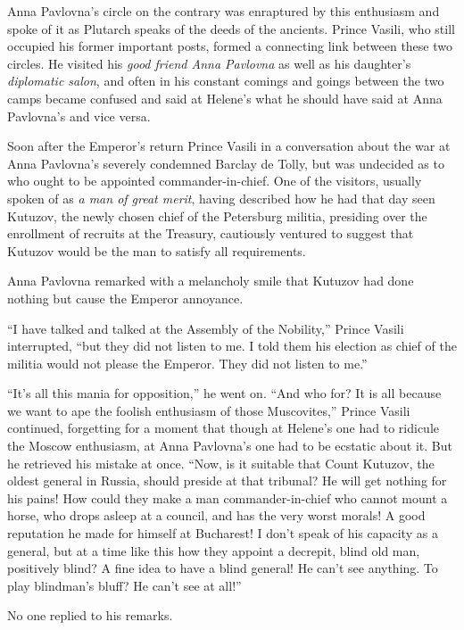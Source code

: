 Anna Pavlovna's circle on the contrary was enraptured by this
enthusiasm and spoke of it as Plutarch speaks of the deeds of the
ancients. Prince Vasili, who still occupied his former important
posts, formed a connecting link between these two circles. He
visited his \emph{good friend Anna Pavlovna} as well as his
daughter's \emph{diplomatic salon}, and often in his constant
comings and goings between the two camps became confused and said
at Helene's what he should have said at Anna Pavlovna's and vice
versa.

Soon after the Emperor's return Prince Vasili in a conversation
about the war at Anna Pavlovna's severely condemned Barclay de
Tolly, but was undecided as to who ought to be appointed
commander-in-chief. One of the visitors, usually spoken of as
\emph{a man of great merit}, having described how he had that day
seen Kutuzov, the newly chosen chief of the Petersburg militia,
presiding over the enrollment of recruits at the Treasury,
cautiously ventured to suggest that Kutuzov would be the man to
satisfy all requirements.

Anna Pavlovna remarked with a melancholy smile that Kutuzov had
done nothing but cause the Emperor annoyance.

``I have talked and talked at the Assembly of the Nobility,''
Prince Vasili interrupted, ``but they did not listen to me. I
told them his election as chief of the militia would not please
the Emperor. They did not listen to me.''

``It's all this mania for opposition,'' he went on. ``And who
for? It is all because we want to ape the foolish enthusiasm of
those Muscovites,'' Prince Vasili continued, forgetting for a
moment that though at Helene's one had to ridicule the Moscow
enthusiasm, at Anna Pavlovna's one had to be ecstatic about
it. But he retrieved his mistake at once. ``Now, is it suitable
that Count Kutuzov, the oldest general in Russia, should preside
at that tribunal? He will get nothing for his pains! How could
they make a man commander-in-chief who cannot mount a horse, who
drops asleep at a council, and has the very worst morals! A good
reputation he made for himself at Bucharest! I don't speak of his
capacity as a general, but at a time like this how they appoint a
decrepit, blind old man, positively blind? A fine idea to have a
blind general! He can't see anything. To play blindman's bluff?
He can't see at all!''

No one replied to his remarks.

